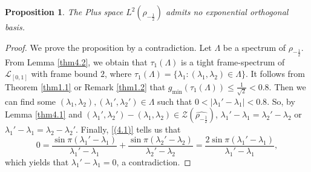 \documentclass[12pt,psfig,reqno]{amsart}
\numberwithin{equation}{section}
\theoremstyle{plain}
\newtheorem{prop}[thm]{Proposition}
\begin{document}
\begin{prop}\label{thm4.3}
	The Plus space $L^2(\rho_{-\frac12})$ admits no exponential orthogonal basis. 
\end{prop}
\begin{proof}
	We prove the proposition by a contradiction. 
Let $\Lambda$ be a spectrum of $\rho_{-\frac12}$. 
From Lemma \ref{thm4.2}, we obtain that $\tau_1(\Lambda)$ is a tight frame-spectrum of $\mathcal{L}_{[0,1]}$ with frame bound $2$, where $\tau_1(\Lambda)=\{\lambda_1:(\lambda_1,\lambda_2)\in\Lambda\}$. 
It follows from Theorem \ref{thm1.1} or Remark \ref{thm1.2} that 
$g_{\min}(\tau_1(\Lambda))\leq \frac{1}{\sqrt{2}}<0.8.$
Then we can find some $(\lambda_1,\lambda_2),(\lambda_1',\lambda_2')\in\Lambda$ such that $0<|\lambda_1'-\lambda_1|<0.8$. 
So, by Lemma \ref{thm4.1} and $(\lambda_1',\lambda_2')-(\lambda_1,\lambda_2)\in\mathcal{Z}(\widehat{\rho_{-\frac12}})$, $\lambda_1'-\lambda_1=\lambda_2'-\lambda_2$ or $\lambda_1'-\lambda_1=\lambda_2-\lambda_2'$. 
Finally, \eqref{(4.1)} tells us that 
$$
0=\frac{\sin\pi(\lambda_1'-\lambda_1)}{\lambda_1'-\lambda_1}+\frac{\sin\pi(\lambda_2'-\lambda_2)}{\lambda_2'-\lambda_2}=\frac{2\sin\pi(\lambda_1'-\lambda_1)}{\lambda_1'-\lambda_1},
$$
which yields that $\lambda_1'-\lambda_1=0$, a contradiction. 
\end{proof}
\end{document}
